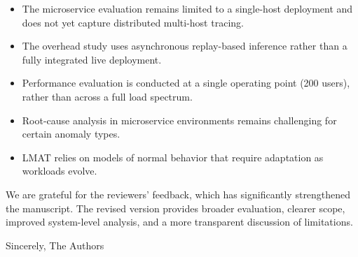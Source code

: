 \documentclass[11pt]{article}
\begin{document}
\begin{itemize}[leftmargin=1.5em]
\item The microservice evaluation remains limited to a single-host deployment and does not yet capture distributed multi-host tracing.
\item The overhead study uses asynchronous replay-based inference rather than a fully integrated live deployment.
\item Performance evaluation is conducted at a single operating point (200 users), rather than across a full load spectrum.
\item Root-cause analysis in microservice environments remains challenging for certain anomaly types.
\item LMAT relies on models of normal behavior that require adaptation as workloads evolve.
\end{itemize}

We are grateful for the reviewers’ feedback, which has significantly strengthened the manuscript. The revised version provides broader evaluation, clearer scope, improved system-level analysis, and a more transparent discussion of limitations.

Sincerely,
\newline
The Authors
\end{document}
